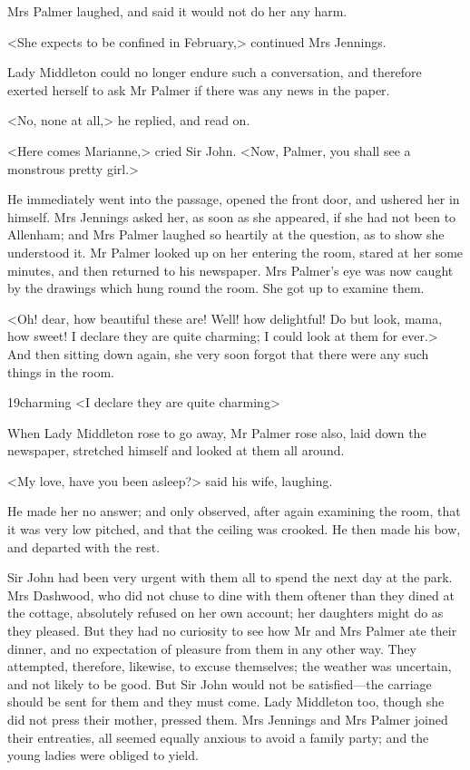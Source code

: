 Mrs Palmer laughed, and said it would not do her any harm.

<She expects to be confined in February,> continued Mrs Jennings.

Lady Middleton could no longer endure such a conversation, and therefore exerted herself to ask Mr Palmer if there was any news in the paper.

<No, none at all,> he replied, and read on.

<Here comes Marianne,> cried Sir John. <Now, Palmer, you shall see a monstrous pretty girl.>

He immediately went into the passage, opened the front door, and ushered her in himself. Mrs Jennings asked her, as soon as she appeared, if she had not been to Allenham; and Mrs Palmer laughed so heartily at the question, as to show she understood it. Mr Palmer looked up on her entering the room, stared at her some minutes, and then returned to his newspaper. Mrs Palmer's eye was now caught by the drawings which hung round the room. She got up to examine them.

<Oh! dear, how beautiful these are! Well! how delightful! Do but look, mama, how sweet! I declare they are quite charming; I could look at them for ever.> And then sitting down again, she very soon forgot that there were any such things in the room.


\begin{bwbigpic}
	[1.0]
	{19charming} 
	{<I declare they are quite charming>} 
\end{bwbigpic}

When Lady Middleton rose to go away, Mr Palmer rose also, laid down the newspaper, stretched himself and looked at them all around.

<My love, have you been asleep?> said his wife, laughing.

He made her no answer; and only observed, after again examining the room, that it was very low pitched, and that the ceiling was crooked. He then made his bow, and departed with the rest.

Sir John had been very urgent with them all to spend the next day at the park. Mrs Dashwood, who did not chuse to dine with them oftener than they dined at the cottage, absolutely refused on her own account; her daughters might do as they pleased. But they had no curiosity to see how Mr and Mrs Palmer ate their dinner, and no expectation of pleasure from them in any other way. They attempted, therefore, likewise, to excuse themselves; the weather was uncertain, and not likely to be good. But Sir John would not be satisfied—the carriage should be sent for them and they must come. Lady Middleton too, though she did not press their mother, pressed them. Mrs Jennings and Mrs Palmer joined their entreaties, all seemed equally anxious to avoid a family party; and the young ladies were obliged to yield.

